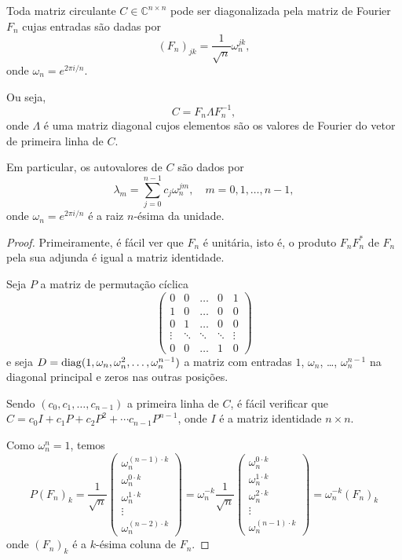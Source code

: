 \begin{theorem*}
  Toda matriz circulante $ C \in \mathbb{C}^{n \times n} $ pode ser diagonalizada pela matriz de Fourier $ F_n $ cujas entradas são dadas por
  \[
    (F_n)_{jk} = \frac{1}{\sqrt{n}} \omega_n^{jk},
  \]
  onde $ \omega_n = e^{2\pi i / n} $.

  Ou seja,
  \[
    C = F_n \Lambda F_n^{-1},
  \]
  onde $ \Lambda $ é uma matriz diagonal cujos elementos são os valores de Fourier do vetor de primeira linha de $ C $.

  Em particular, os autovalores de $ C $ são dados por
  \[
    \lambda_m = \sum_{j=0}^{n-1} c_j \omega_n^{jm}, \quad m = 0, 1, \dots, n-1,
  \]
  onde $ \omega_n = e^{2\pi i / n} $ é a raiz $ n $-ésima da unidade.
\end{theorem*}
\begin{proof}
    Primeiramente, é fácil ver que $F_n$ é unitária, isto é, o produto $F_n F_n^*$ de $F_n$ pela sua adjunda é igual a matriz identidade.

    Seja $P$ a matriz de permutação cíclica \[\begin{pmatrix}
        0 & 0 & \dots & 0 & 1 \\
        1 & 0 & \dots & 0 & 0 \\
        0 & 1 & \dots & 0 & 0 \\
        \vdots & \ddots & \ddots & \ddots & \vdots \\
        0 & 0 & \dots & 1 & 0
    \end{pmatrix}\] e seja $D = \operatorname{diag}(1, \omega_n, \omega_n^2, \dots, \omega_n^{n-1})$ a matriz com entradas $1$, $\omega_n$, \dots, $\omega_n^{n-1}$ na diagonal principal e zeros nas outras posições.

    Sendo $(c_0, c_1, \dots, c_{n-1})$ a primeira linha de $C$, é fácil verificar que $C = c_0 I + c_1 P + c_2 P^2 + \cdots c_{n-1} P^{n-1}$, onde $I$ é a matriz identidade $n \times n$.

    Como $\omega_n^n = 1$, temos \[ P (F_n)_k = \frac{1}{\sqrt{n}} \begin{pmatrix}
        \omega_n^{(n-1) \cdot k} \\
        \omega_n^{0 \cdot k} \\
        \omega_n^{1 \cdot k} \\
        \vdots \\
        \omega_n^{(n - 2) \cdot k}
    \end{pmatrix} = \omega_n^{-k} \frac{1}{\sqrt{n}} \begin{pmatrix}
        \omega_n^{0 \cdot k} \\
        \omega_n^{1 \cdot k} \\
        \omega_n^{2 \cdot k} \\
        \vdots \\
        \omega_n^{(n - 1) \cdot k}
    \end{pmatrix} = \omega_n^{-k} (F_n)_k \] onde $(F_n)_k$ é a $k$-ésima coluna de $F_n$.


\end{proof}
